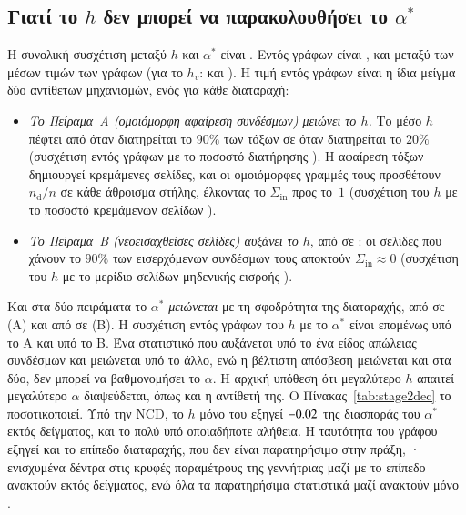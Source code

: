 \documentclass[11pt,a4paper]{article}
\theoremstyle{definition}
\theoremstyle{remark}
\newcommand{\Sin}{\Sigma_{\mathrm{in}}}
\begin{document}
\subsection{Γιατί το \texorpdfstring{$h$}{h} δεν μπορεί να παρακολουθήσει το \texorpdfstring{$\alpha^*$}{α*}}
\label{sec:hmech}
Η συνολική συσχέτιση μεταξύ $h$ και $\alpha^*$ είναι \STwoPooled. Εντός γράφων είναι \STwoWithin, και
μεταξύ των μέσων τιμών των γράφων \STwoBetween{} (για το $h_v$: \STwoWithinHv{} και \STwoBetweenHv). Η
τιμή εντός γράφων είναι η ίδια μείγμα δύο αντίθετων μηχανισμών, ενός για κάθε διαταραχή:
\begin{itemize}[leftmargin=1.4em,itemsep=1pt]
\item \emph{Το Πείραμα~Α (ομοιόμορφη αφαίρεση συνδέσμων) μειώνει το $h$.} Το μέσο $h$ πέφτει από
\STwoHmildA{} όταν διατηρείται το $90\%$ των τόξων σε \STwoHsevereA{} όταν διατηρείται το $20\%$
(συσχέτιση εντός γράφων με το ποσοστό διατήρησης \STwoHkeepA). Η αφαίρεση τόξων δημιουργεί κρεμάμενες
σελίδες, και οι ομοιόμορφες γραμμές τους προσθέτουν $n_{\mathrm d}/n$ σε κάθε άθροισμα στήλης, έλκοντας
το $\Sin$ προς το~$1$ (συσχέτιση του $h$ με το ποσοστό κρεμάμενων σελίδων \STwoHdangA).
\item \emph{Το Πείραμα~Β (νεοεισαχθείσες σελίδες) αυξάνει το $h$}, από \STwoHmildB{} σε \STwoHsevereB{}:
οι σελίδες που χάνουν το $90\%$ των εισερχόμενων συνδέσμων τους αποκτούν $\Sin\approx0$ (συσχέτιση του
$h$ με το μερίδιο σελίδων μηδενικής εισροής \STwoHzinB).
\end{itemize}
Και στα δύο πειράματα το $\alpha^*$ \emph{μειώνεται} με τη σφοδρότητα της διαταραχής, από \STwoAmildA{}
σε \STwoAsevereA{} (Α) και από \STwoAmildB{} σε \STwoAsevereB{} (Β). Η συσχέτιση εντός γράφων του $h$ με
το $\alpha^*$ είναι επομένως \STwoHastarA{} υπό το Α και \STwoHastarB{} υπό το Β. Ένα στατιστικό που
αυξάνεται υπό το ένα είδος απώλειας συνδέσμων και μειώνεται υπό το άλλο, ενώ η βέλτιστη απόσβεση
μειώνεται και στα δύο, δεν μπορεί να βαθμονομήσει το $\alpha$. Η αρχική υπόθεση ότι μεγαλύτερο $h$
απαιτεί μεγαλύτερο $\alpha$ διαψεύδεται, όπως και η αντίθετή της. Ο Πίνακας~\ref{tab:stage2dec} το
ποσοτικοποιεί. Υπό την NCD, το $h$ μόνο του εξηγεί $-0.02$ της διασποράς του $\alpha^*$ εκτός
δείγματος, και το πολύ \STwoDecHmax{} υπό οποιαδήποτε αλήθεια. Η ταυτότητα του γράφου εξηγεί
\STwoDecBase{} και το επίπεδο διαταραχής, που δεν είναι παρατηρήσιμο στην πράξη, \STwoDecLevel·
ενισχυμένα δέντρα στις κρυφές παραμέτρους της γεννήτριας μαζί με το επίπεδο ανακτούν \STwoDecHidden{}
εκτός δείγματος, ενώ όλα τα παρατηρήσιμα στατιστικά μαζί ανακτούν μόνο \STwoDecObs.
\end{document}
